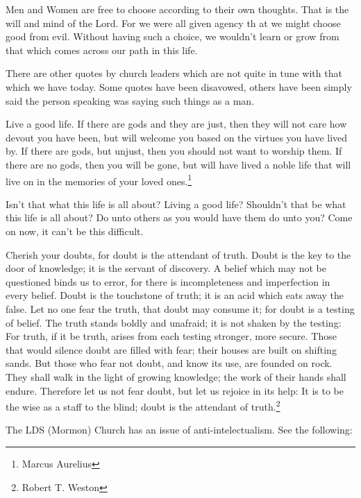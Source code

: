 Men and Women are free to choose according to their own thoughts. That is the 
will and mind of the Lord. For we were all given agency th at we might choose 
good from evil. Without having such a choice, we wouldn't learn or grow from 
that which comes across our path in this life.

There are other quotes by church leaders which are not quite in tune with that 
which we have today. Some quotes have been disavowed, others have been simply 
said the person speaking was saying such things as a man.

\begin{displayquote}
Live a good life. If there are gods and they are just, then they will not care 
how devout you have been, but will welcome you based on the virtues you have 
lived by. If there are gods, but unjust, then you should not want to worship 
them. If there are no gods, then you will be gone, but will have lived a noble 
life that will live on in the memories of your loved ones.\footnote{
Marcus Aurelius}
\end{displayquote}

Isn't that what this life is all about? Living a good life? Shouldn't that be
what this life is all about? Do unto others as you would have them do unto you?
Come on now, it can't be this difficult.

\begin{displayquote}
Cherish your doubts, for doubt is the attendant of truth. Doubt is the key to the
door of knowledge; it is the servant of discovery. A belief which may not be
questioned binds us to error, for there is incompleteness and imperfection in every
belief. Doubt is the touchstone of truth; it is an acid which eats away the false.
Let no one fear the truth, that doubt may consume it; for doubt is a testing of
belief. The truth stands boldly and unafraid; it is not shaken by the testing:
For truth, if it be truth, arises from each testing stronger, more secure. Those
that would silence doubt are filled with fear; their houses are built on shifting
sands. But those who fear not doubt, and know its use, are founded on rock.
They shall walk in the light of growing knowledge; the work of their hands shall
endure. Therefore let us not fear doubt, but let us rejoice in its help: It is to be
the wise as a staff to the blind; doubt is the attendant of truth.\footnote{
Robert T. Weston}
\end{displayquote}

The LDS (Mormon) Church has an issue of anti-intelectualism. See the following:


